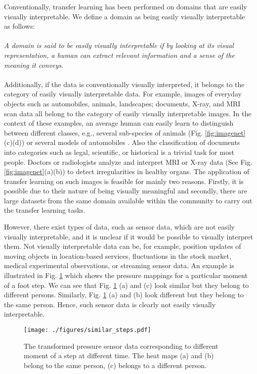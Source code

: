 \par
Conventionally, transfer learning has been performed on domains that are easily visually interpretable. We define a domain as being easily visually interpretable as follows:
\\\\
\emph{A domain is said to be easily visually interpretable if by looking at its visual representation, a human can extract relevant information and a sense of the meaning it conveys.}
\\\\
Additionally, if the data is conventionally visually interpreted, it belongs to the category of easily visually interpretable data. For example, images of everyday objects such as automobiles, animals, landscapes; documents, X-ray, and MRI scan data all belong to the category of easily visually interpretable images. In the context of these examples, an average human can easily learn to distinguish between different classes, e.g., several sub-species of animals (Fig. \ref{fig:imagenet}(c)(d)) or several models of automobiles \cite{russakovsky2015imagenet}. Also the classification of documents into categories such as legal, scientific, or historical is a trivial task for most people. Doctors or radiologists analyze and interpret MRI or X-ray data (See Fig. \ref{fig:imagenet}(a)(b)) to detect irregularities in healthy organs. The application of transfer learning on such images is feasible for mainly two reasons. Firstly, it is possible due to their nature of being visually meaningful and secondly, there are large datasets from the same domain available within the community to carry out the transfer learning tasks. 

However, there exist types of data, such as sensor data, which are not easily visually interpretable, and it is unclear if it would be possible to visually interpret them. Not visually interpretable data can be, for example, position updates of moving objects in location-based services, fluctuations in the stock market, medical experimental observations, or streaming sensor data.  An example is illustrated in Fig. \ref{fig:similar_steps} which shows the pressure mappings for a particular moment of a foot step. We can see that Fig. \ref{fig:similar_steps} (a) and (c) look similar but they belong to different persons. Similarly, Fig. \ref{fig:similar_steps} (a) and (b) look different but they belong to the same person. Hence, such sensor data is clearly not easily visually interpretable.

\begin{figure}
	\centering
	\texttt{[image: ./figures/similar\_steps.pdf]}
	\caption{The transformed pressure sensor data corresponding to different moment of a step at different time. The heat maps (a) and (b) belong to the same person, (c) belongs to a different person.}
	\label{fig:similar_steps}
\end{figure}


